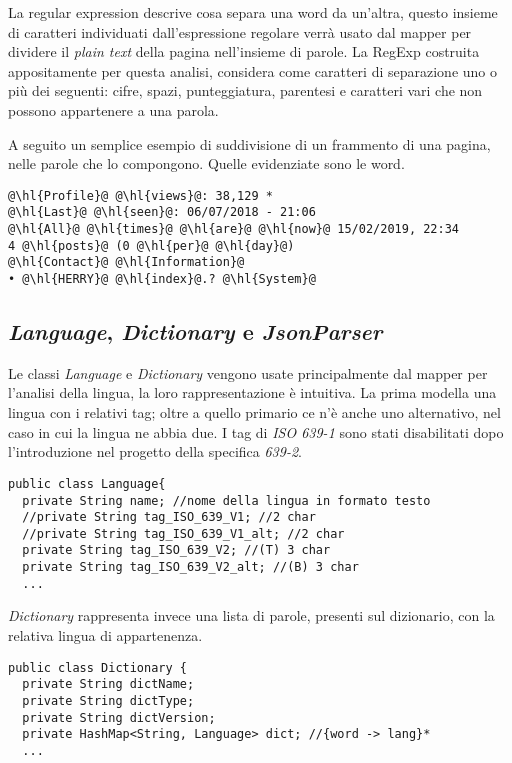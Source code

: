 \documentclass{article}
\newcommand{\isoOne}{\textit{ISO 639-1}}
\newcommand{\pt}{\textit{plain text}}
\newcommand{\class}[1]{\textit{#1}}
\begin{document}
La regular expression descrive cosa separa una word da un'altra, questo insieme di caratteri individuati dall'espressione regolare verrà usato dal mapper per dividere il \pt{} della pagina nell'insieme di parole. La RegExp costruita appositamente per questa analisi, considera come caratteri di separazione uno o più dei seguenti: cifre, spazi, punteggiatura, parentesi e caratteri vari che non possono appartenere a una parola. 

A seguito un semplice esempio di suddivisione di un frammento di una pagina, nelle parole che lo compongono. Quelle evidenziate sono le word.

\begin{verbatim}
@\hl{Profile}@ @\hl{views}@: 38,129 *
@\hl{Last}@ @\hl{seen}@: 06/07/2018 - 21:06
@\hl{All}@ @\hl{times}@ @\hl{are}@ @\hl{now}@ 15/02/2019, 22:34
4 @\hl{posts}@ (0 @\hl{per}@ @\hl{day}@)
@\hl{Contact}@ @\hl{Information}@
• @\hl{HERRY}@ @\hl{index}@.? @\hl{System}@
\end{verbatim}

\subsection{\class{Language}, \class{Dictionary} e \class{JsonParser}}

Le classi \class{Language} e \class{Dictionary} vengono usate principalmente dal mapper per l'analisi della lingua, la loro rappresentazione è intuitiva. La prima modella una lingua con i relativi tag; oltre a quello primario ce n'è anche uno alternativo, nel caso in cui la lingua ne abbia due. I tag di \isoOne{} sono stati disabilitati dopo l'introduzione nel progetto della specifica \textit{639-2}. 

\begin{verbatim}
public class Language{
  private String name; //nome della lingua in formato testo
  //private String tag_ISO_639_V1; //2 char
  //private String tag_ISO_639_V1_alt; //2 char
  private String tag_ISO_639_V2; //(T) 3 char
  private String tag_ISO_639_V2_alt; //(B) 3 char
  ...
\end{verbatim}
\noindent
\class{Dictionary} rappresenta invece una lista di parole, presenti sul dizionario, con la relativa lingua di appartenenza. 

\begin{verbatim}
public class Dictionary {
  private String dictName;
  private String dictType;
  private String dictVersion;
  private HashMap<String, Language> dict; //{word -> lang}*
  ...
\end{verbatim}
\end{document}
